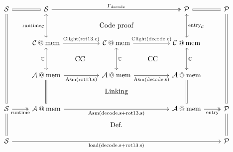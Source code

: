 \documentclass[aspectratio=1610,mathserif]{beamer}
\newcommand{\kw}[1]{\ensuremath{ \mathrm{#1} }}
\begin{document}
\begin{frame}[fragile]
  \[
    \begin{tikzcd}[row sep=small,column sep=small]
      \mathcal{S} \ar[rr,equal] \ar[dddddd, equal]
      &&
      \mathcal{S} \ar[rrrr, twoheadrightarrow, "\Gamma_\kw{decode}"]
         \ar[dd, leftrightarrow, "\kw{runtime}_\mathcal{C}"']
      &&
      &&
      \mathcal{P} \ar[rr, equal]
        \ar[dd, "\kw{entry}_\mathcal{C}", leftrightarrow]
      &&
      \mathcal{P} \ar[dddddd,equal]
      \\
      && && \text{Code proof} && &&
      \\
      &&
      \mathcal{C} \mathbin@ \kw{mem} \ar[rr, "\kw{Clight}(\kw{rot13.c})"]
      \ar[dd, leftrightarrow, "\mathbb{C}"']
      &&
      \mathcal{C} \mathbin@ \kw{mem} \ar[rr, "\kw{Clight}(\kw{decode.c})"]
      \ar[dd, leftrightarrow, "\mathbb{C}"]
      &&
      \mathcal{C} \mathbin@ \kw{mem}
      \ar[dd, leftrightarrow, "\mathbb{C}"]
      \\
      &  & & \text{CC} & &\text{CC} & & &
      \\
      &&
      \mathcal{A} \mathbin@ \kw{mem} \ar[rr, "\kw{Asm}(\kw{rot13.s})"']
        \ar[dd, equal]
      &&
      \mathcal{A} \mathbin@ \kw{mem} \ar[rr, "\kw{Asm}(\kw{decode.s})"']
      &&
      \mathcal{A} \mathbin@ \kw{mem}
        \ar[dd, equal]
      \\
      && && \text{Linking} && &&
      \\
      \mathcal{S} \ar[rr, "\kw{runtime}"', twoheadrightarrow] \ar[dd,equal] &&
      \mathcal{A} \mathbin@ \kw{mem} \ar[rrrr, "\kw{Asm}(\kw{decode.s} + \kw{rot13.s})"'] &&&&
      \mathcal{A} \mathbin@ \kw{mem} \ar[rr, "\kw{entry}"', twoheadrightarrow] &&
      \mathcal{P} \ar[dd,equal]
      \\
      && && \text{Def.} && &&
      \\
      \mathcal{S} \ar[rrrrrrrr, "\kw{load}(\kw{decode.s} + \kw{rot13.s})"']
      && && && &&
      \mathcal{P}
    \end{tikzcd}
  \]
\end{frame}
\end{document}
